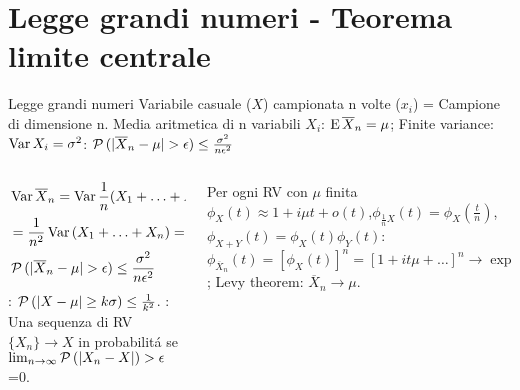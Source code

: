 \section{Legge grandi numeri - Teorema limite centrale}

\begin{frame}{Legge grandi numeri}
Variabile casuale ($X$) campionata n volte ($x_i$) = Campione di dimensione n.
    Media aritmetica di n variabili $X_i$: $\operatorname{E}{\overline{X}_n}=\mu$; Finite variance: $\operatorname{Var}{X_i}=\sigma^2$: $\prob{(|\overline{X}_n-\mu|>\epsilon)}\leq\frac{\sigma^2}{n\epsilon^2}$
    \begin{columns}
    \begin{column}{0.5\textwidth}
\begin{align*}
&\var{\overline{X}_n}=\var{\frac{1}{n}(X_1+\ldots+X_n)}\\
&=\frac{1}{n^2}\var{(X_1+\ldots+X_n)}=\frac{n\sigma^2}{n^2}=\frac{\sigma^2}{n}\\
&\prob{(|\overline{X}_n-\mu|>\epsilon)}\leq\frac{\sigma^2}{n\epsilon^2}
\end{align*}
: $\operatorname{\mathcal{P}}{(|X-\mu|\geq k\sigma)}\leq\frac{1}{k^2}$.
: Una sequenza di RV $\{X_n\}\to X$ in probabilit\'a se $\lim_{n\to\infty}\operatorname{\mathcal{P}}{(|X_n-X|)>\epsilon}$=0.
    \end{column}
    \begin{column}{0.5\textwidth}
Per ogni RV con $\mu$ finita $\phi_X(t)\approx1+i\mu t+o(t)$,$\phi_{\frac{1}{n}X}(t)=\phi_X(\frac{t}{n})$, $\phi_{X+Y}(t)=\phi_X(t)\phi_Y(t)$:
$\phi_{\overline{X}_n}(t)=[\phi_X(t)]^n=[1+it\mu+\ldots]^n\to\exp{i\mu t}$; Levy theorem: $\overline{X}_n\to\mu$.
    \end{column}
    \end{columns}
\end{frame}

